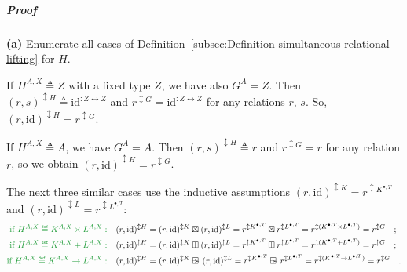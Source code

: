 \subparagraph{Proof}

\textbf{(a)} Enumerate all cases of Definition~\ref{subsec:Definition-simultaneous-relational-lifting}
for $H$.

If $H^{A,X}\triangleq Z$ with a fixed type $Z$, we have also $G^{A}=Z$.
Then $(r,s)^{\updownarrow H}\triangleq\text{id}^{:Z\leftrightarrow Z}$
and $r^{\updownarrow G}=\text{id}^{:Z\leftrightarrow Z}$ for any
relations $r$, $s$. So, $(r,\text{id})^{\updownarrow H}=r^{\updownarrow G}$.

If $H^{A,X}\triangleq A$, we have $G^{A}=A$. Then $(r,s)^{\updownarrow H}\triangleq r$
and $r^{\updownarrow G}=r$ for any relation $r$, so we obtain $(r,\text{id})^{\updownarrow H}=r^{\updownarrow G}$.

The next three similar cases use the inductive assumptions $(r,\text{id})^{\updownarrow K}=r^{\updownarrow K^{\bullet,T}}$
and $(r,\text{id})^{\updownarrow L}=r^{\updownarrow L^{\bullet,T}}$:
\begin{align*}
{\color{greenunder}\text{if }H^{A,X}\triangleq K^{A,X}\times L^{A,X}:}\quad & (r,\text{id})^{\updownarrow H}=(r,\text{id})^{\updownarrow K}\boxtimes(r,\text{id})^{\updownarrow L}=r^{\updownarrow K^{\bullet,T}}\boxtimes r^{\updownarrow L^{\bullet,T}}=r^{\updownarrow(K^{\bullet,T}\times L^{\bullet,T})}=r^{\updownarrow G}\quad;\\
{\color{greenunder}\text{if }H^{A,X}\triangleq K^{A,X}+L^{A,X}:}\quad & (r,\text{id})^{\updownarrow H}=(r,\text{id})^{\updownarrow K}\boxplus(r,\text{id})^{\updownarrow L}=r^{\updownarrow K^{\bullet,T}}\boxplus r^{\updownarrow L^{\bullet,T}}=r^{\updownarrow(K^{\bullet,T}+L^{\bullet,T})}=r^{\updownarrow G}\quad;\\
{\color{greenunder}\text{if }H^{A,X}\triangleq K^{A,X}\rightarrow L^{A,X}:}\quad & (r,\text{id})^{\updownarrow H}=(r,\text{id})^{\updownarrow K}\ogreaterthan(r,\text{id})^{\updownarrow L}=r^{\updownarrow K^{\bullet,T}}\ogreaterthan r^{\updownarrow L^{\bullet,T}}=r^{\updownarrow(K^{\bullet,T}\rightarrow L^{\bullet,T})}=r^{\updownarrow G}\quad.
\end{align*}

